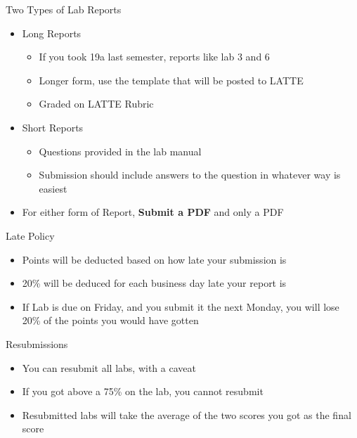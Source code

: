 \documentclass{beamer}
\begin{document}
\begin{frame}{Two Types of Lab Reports}
  \begin{itemize}
  \item Long Reports
    \begin{itemize}
    \item If you took 19a last semester, reports like lab 3 and 6
    \item Longer form, use the template that will be posted to LATTE
    \item Graded on LATTE Rubric
    \end{itemize}
  \item Short Reports
    \begin{itemize}
    \item Questions provided in the lab manual
    \item Submission should include answers to the question in whatever way is easiest
    \end{itemize}
  \item For either form of Report, \textbf{Submit a PDF} and only a PDF
  \end{itemize}
\end{frame}

\begin{frame}{Late Policy}
  \begin{itemize}
  \item Points will be deducted based on how late your submission is
  \item 20\% will be deduced for each business day late your report is
  \item If Lab is due on Friday, and you submit it the next Monday, you will lose 20\% of the points you would have gotten    
  \end{itemize}
\end{frame}

\begin{frame}{Resubmissions}
  \begin{itemize}
  \item You can resubmit all labs, with a caveat
  \item If you got above a 75\% on the lab, you cannot resubmit
  \item Resubmitted labs will take the average of the two scores you got as the final score
  \end{itemize}
\end{frame}
\end{document}
